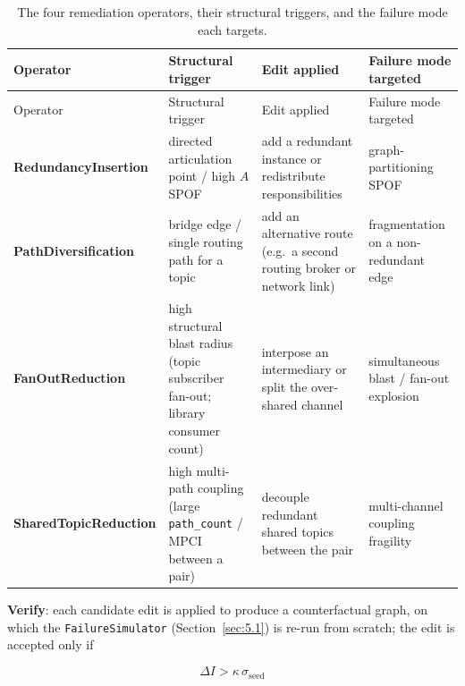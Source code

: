 \begin{longtable}[]{@{}
  >{\raggedright\arraybackslash}p{}
  >{\raggedright\arraybackslash}p{}
  >{\raggedright\arraybackslash}p{}
  >{\raggedright\arraybackslash}p{}@{}}
\caption{The four remediation operators, their structural triggers, and the failure mode each targets.\label{tab:4}}\tabularnewline
\toprule
Operator & Structural trigger & Edit applied & Failure mode targeted \\
\midrule
\endfirsthead
\toprule
Operator & Structural trigger & Edit applied & Failure mode targeted \\
\midrule
\endhead
\textbf{RedundancyInsertion} & directed articulation point / high \(A\) SPOF & add a redundant instance or redistribute responsibilities & graph-partitioning SPOF \\
\textbf{PathDiversification} & bridge edge / single routing path for a topic & add an alternative route (e.g.~a second routing broker or network link) & fragmentation on a non-redundant edge \\
\textbf{FanOutReduction} & high structural blast radius (topic subscriber fan-out; library consumer count) & interpose an intermediary or split the over-shared channel & simultaneous blast / fan-out explosion \\
\textbf{SharedTopicReduction} & high multi-path coupling (large \texttt{path\_count} / MPCI between a pair) & decouple redundant shared topics between the pair & multi-channel coupling fragility \\
\bottomrule
\end{longtable}

\textbf{Verify}: each candidate edit is applied to produce a counterfactual graph, on which the
\texttt{FailureSimulator} (Section~\ref{sec:5.1}) is re-run from scratch; the edit is accepted only if

\begin{equation}
\Delta I > \kappa\,\sigma_{\text{seed}}
\end{equation}

